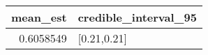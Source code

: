 \begin{longtable}{rl}
\toprule
mean\_est & credible\_interval\_95 \\ 
\midrule
0.6058549 & [0.21,0.21] \\ 
\bottomrule
\end{longtable}

